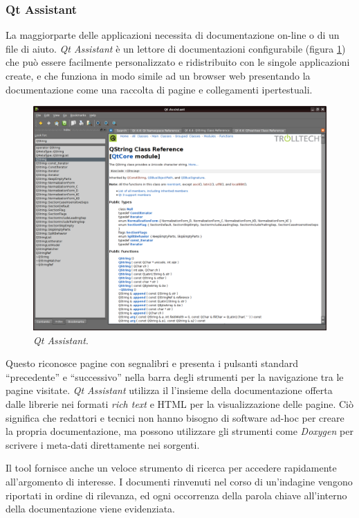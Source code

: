 \subsubsection{Qt Assistant}
La maggiorparte delle applicazioni necessita di documentazione on-line o di un file di aiuto. \emph{Qt Assistant} è un lettore di documentazioni configurabile (figura \ref{figura:qtassistant}) che può essere facilmente personalizzato e ridistribuito con le singole applicazioni create, e che funziona in modo simile ad un browser web presentando la documentazione come una raccolta di pagine e collegamenti ipertestuali. 
\begin{figure}[!htb]
	\centering
	\includegraphics[width=12cm]{images/qtassistant.png}
	\caption{\emph{Qt Assistant}.}
	\label{figura:qtassistant}
\end{figure}
Questo riconosce pagine con segnalibri e presenta i pulsanti standard ``precedente'' e ``successivo'' nella barra degli strumenti per la navigazione tra le pagine visitate. \emph{Qt Assistant} utilizza il l'insieme della documentazione offerta dalle librerie \qt{} nei formati \emph{rich text} e HTML per la visualizzazione delle pagine. Ciò significa che redattori e tecnici non hanno bisogno di software ad-hoc per creare la propria documentazione, ma possono utilizzare gli strumenti come \emph{Doxygen} per scrivere i meta-dati direttamente nei sorgenti.

Il tool fornisce anche un veloce strumento di ricerca per accedere rapidamente all'argomento di interesse. I documenti rinvenuti nel corso di un'indagine vengono riportati in ordine di rilevanza, ed ogni occorrenza della parola chiave all'interno della documentazione viene evidenziata.

